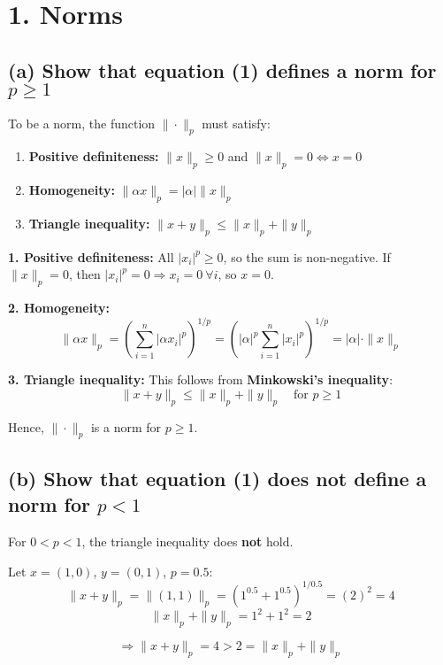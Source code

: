 \documentclass{article}
\begin{document}
\maketitle
\section*{1. Norms}

\subsection*{(a) Show that equation (1) defines a norm for \( p \geq 1 \)}
To be a norm, the function \( \|\cdot\|_p \) must satisfy:
\begin{enumerate}
    \item \textbf{Positive definiteness:} \( \|x\|_p \geq 0 \) and \( \|x\|_p = 0 \iff x = 0 \)
    \item \textbf{Homogeneity:} \( \|\alpha x\|_p = |\alpha|\|x\|_p \)
    \item \textbf{Triangle inequality:} \( \|x + y\|_p \leq \|x\|_p + \|y\|_p \)
\end{enumerate}

\textbf{1. Positive definiteness:} All \( |x_i|^p \geq 0 \), so the sum is non-negative. If \( \|x\|_p = 0 \), then \( |x_i|^p = 0 \Rightarrow x_i = 0 \ \forall i \), so \( x = 0 \).

\textbf{2. Homogeneity:}
\[
\|\alpha x\|_p = \left( \sum_{i=1}^n |\alpha x_i|^p \right)^{1/p} = \left( |\alpha|^p \sum_{i=1}^n |x_i|^p \right)^{1/p} = |\alpha| \cdot \|x\|_p
\]

\textbf{3. Triangle inequality:} This follows from \textbf{Minkowski's inequality}:
\[
\|x + y\|_p \leq \|x\|_p + \|y\|_p \quad \text{for } p \geq 1
\]

Hence, \( \|\cdot\|_p \) is a norm for \( p \geq 1 \).

\subsection*{(b) Show that equation (1) does not define a norm for \( p < 1 \)}

For \( 0 < p < 1 \), the triangle inequality does \textbf{not} hold.

Let \( x = (1, 0) \), \( y = (0, 1) \), \( p = 0.5 \):
\[
\|x + y\|_p = \|(1, 1)\|_p = (1^{0.5} + 1^{0.5})^{1/0.5} = (2)^{2} = 4
\]
\[
\|x\|_p + \|y\|_p = 1^2 + 1^2 = 2
\]

\[
\Rightarrow \|x + y\|_p = 4 > 2 = \|x\|_p + \|y\|_p
\]
\end{document}
